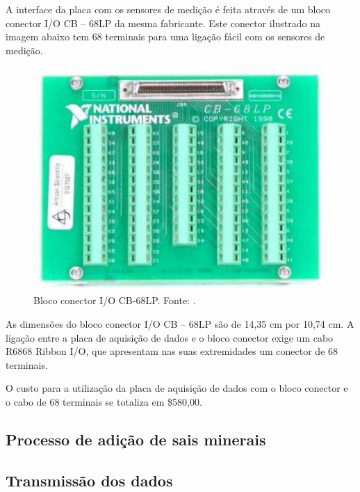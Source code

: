	A interface da placa com os sensores de medição é feita através de um bloco conector I/O CB – 68LP da mesma fabricante. Este conector ilustrado na imagem abaixo tem 68 terminais para uma ligação fácil com os sensores de medição.
    
	\begin{figure}[!ht]
	  \centering
	  \includegraphics[scale=0.5]{editaveis/figuras/bloco_conector_placa_aquisicao}
	  \caption[Bloco conector I/O CB-68LP]
	      {Bloco conector I/O CB-68LP. Fonte: \cite{national04}.}
	\label{bloco_conector_placa_aquisicao}
	\end{figure}
	
	As dimensões do bloco conector I/O CB – 68LP são de 14,35 cm por 10,74 cm. A ligação entre a placa de aquisição de dados e o bloco conector exige um cabo R6868 Ribbon I/O, que apresentam nas suas extremidades um conector de 68 terminais. 
	
	O custo para a utilização da placa de aquisição de dados com o bloco conector e o cabo de 68 terminais se totaliza em \$580,00.
	
    \pagebreak
    \subsection{Processo de adição de sais minerais}
    
      
      
    \subsection{Transmissão dos dados}
    
